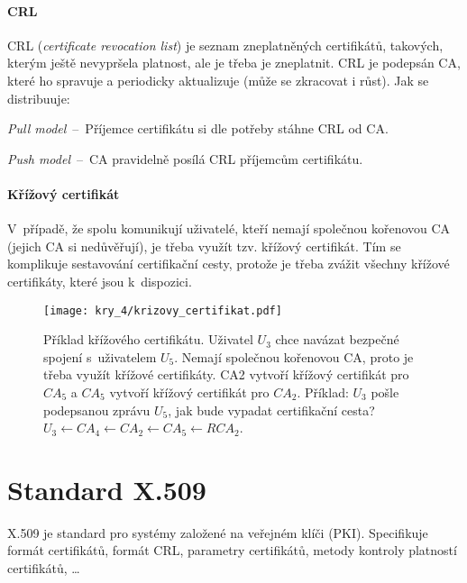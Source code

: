 \paragraph*{CRL} CRL (\textit{certificate revocation list}) je seznam zneplatněných certifikátů, takových, kterým ještě nevypršela platnost, ale je třeba je zneplatnit. CRL je podepsán CA, které ho spravuje a periodicky aktualizuje (může se zkracovat i růst). Jak se distribuuje:\begin{compactitem}
    \item \textit{Pull model}~--~Příjemce certifikátu si dle potřeby stáhne CRL od CA.
    \item \textit{Push model}~--~CA pravidelně posílá CRL příjemcům certifikátu.
\end{compactitem}

\paragraph*{Křížový certifikát} V~případě, že spolu komunikují uživatelé, kteří nemají společnou kořenovou CA (jejich CA si nedůvěřují), je třeba využít tzv. křížový certifikát. Tím se komplikuje sestavování certifikační cesty, protože je třeba zvážit všechny křížové certifikáty, které jsou k~dispozici.

\begin{figure}[H]
    \centering
    \texttt{[image: kry\_4/krizovy\_certifikat.pdf]}
    \caption{Příklad křížového certifikátu. Uživatel $U_3$ chce navázat bezpečné spojení s~uživatelem $U_5$. Nemají společnou kořenovou CA, proto je třeba využít křížové certifikáty. CA2 vytvoří křížový certifikát pro $CA_5$ a $CA_5$ vytvoří křížový certifikát pro $CA_2$. Příklad: $U_3$ pošle podepsanou zprávu $U_5$, jak bude vypadat certifikační cesta? $U_3 \leftarrow CA_4 \leftarrow CA_2 \leftarrow CA_5 \leftarrow RCA_2$.}
\end{figure}


\section{Standard X.509}

X.509 je standard pro systémy založené na veřejném klíči (PKI). Specifikuje formát certifikátů, formát CRL, parametry certifikátů, metody kontroly platností certifikátů, \dots

